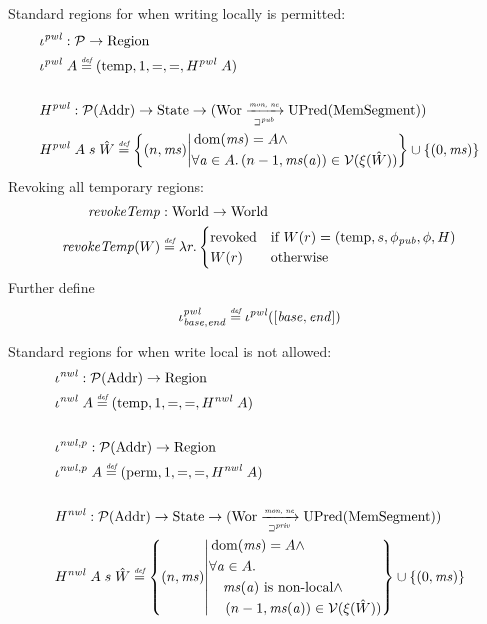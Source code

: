 \documentclass[a4paper]{article}
\newcommand{\fun}{\rightarrow}
\newcommand{\defeq}{\stackrel{\textit{\tiny{def}}}{=}}
\newcommand{\union}{\mathbin{\cup}}
\DeclareMathOperator{\dom}{dom}
\newcommand{\var}[1]{\mathit{#1}}
\newcommand{\hs}{\var{ms}}
\newcommand{\ms}{\hs}
\newcommand{\addr}{\var{a}}
\newcommand{\start}{\var{base}}
\newcommand{\addrend}{\var{end}}
\newcommand{\nwl}{\var{nwl}}
\newcommand{\pwl}{\var{pwl}}
\newcommand{\plainfun}[2]{
  \ifthenelse{\equal{#2}{}}
  {\mathit{#1}}
  {\mathit{#1}(#2)}
}
\newcommand{\revokeTemp}[1]{\plainfun{revokeTemp}{#1}}
\newcommand{\pub}{\var{pub}}
\newcommand{\futurewk}{\mathbin{\sqsupseteq}^{\var{pub}}}
\newcommand{\futurestr}{\mathbin{\sqsupseteq}^{\var{priv}}}
\newcommand{\monwknefun}{\xrightarrow[\text{\tiny{$\futurewk$}}]{\textit{\tiny{mon, ne}}}}
\newcommand{\monstrnefun}{\xrightarrow[\text{\tiny{$\futurestr$}}]{\textit{\tiny{mon, ne}}}}
\newcommand{\asmType}{\plaindom{AsmType}}
\newcommand{\plaindom}[1]{\mathrm{#1}}
\newcommand{\Addrs}{\plaindom{Addr}}
\newcommand{\HeapSegments}{\plaindom{MemSegment}}
\newcommand{\States}{\plaindom{State}}
\newcommand{\Regions}{\plaindom{Region}}
\newcommand{\Worlds}{\plaindom{World}}
\newcommand{\Wor}{\plaindom{Wor}}
\newcommand{\UPred}[1]{\plaindom{UPred}(#1)}
\newcommand{\intr}[2]{\mathcal{#1}}
\newcommand{\valueintr}[1]{\intr{V}{#1}}
\newcommand{\stdvr}{\valueintr{\asmType}}
\newcommand{\npair}[2][n]{\left(#1,#2 \right)}
\newcommand{\plainview}[1]{\mathrm{#1}}
\newcommand{\perma}{\plainview{perm}}
\newcommand{\temp}{\plainview{temp}}
\newcommand{\revoked}{\plainview{revoked}}
\newcommand{\nonlocal}[1]{\ensuremath{#1} \text{ is non-local}}
\begin{document}
Standard regions for when writing locally is permitted:
\begin{align*}
  &\iota^\pwl : \cal{P} \fun \Regions\\
  &\iota^\pwl\;A \defeq (\temp,1,=,=,H^\pwl \; A) \\
  \\
  &H^\pwl : \cal{P}(\Addrs) \fun \States \fun (\Wor \monwknefun \UPred{\HeapSegments})\\
  &H^\pwl\; A \; s \; \hat{W} \defeq \left\{\npair{\hs} \middle|
    \begin{aligned}
      &\dom(\hs) = A \land \\
      &\forall \addr \in A \ldotp \npair[n-1]{\hs(\addr)} \in \stdvr(\xi(\hat{W}))
    \end{aligned}
        \right\} \union \{\npair[0]{\ms} \}
\end{align*}
Revoking all temporary regions:
\begin{align*}
  \revokeTemp{} & : \Worlds \fun \Worlds \\
  \revokeTemp{W} & \defeq \lambda r \ldotp 
                   \begin{cases}
                     \revoked            & \text{if }W(r) = (\temp,s,\phi_\pub,\phi,H) \\
                     W(r)                & \text{otherwise}
                   \end{cases}
\end{align*}
Further define
\[
  \iota^\pwl_{\start,\addrend} \defeq \iota^\pwl([\start,\addrend])
\]


\newcommand{\wrev}[1]{\revokeTemp{#1}}


Standard regions for when write local is not allowed:
\begin{align*}
  &\iota^\nwl : \cal{P}(\Addrs) \fun \Regions \\
  &\iota^\nwl\; A \defeq (\temp,1,=,=,H^\nwl\;A) \\
  \\
  &\iota^{\nwl,p} : \cal{P}(\Addrs) \fun \Regions \\
  &\iota^{\nwl,p}\;A \defeq (\perma,1,=,=,H^\nwl\;A)\\
  \\
  &H^\nwl : \cal{P}(\Addrs) \fun \States \fun (\Wor \monstrnefun \UPred{\HeapSegments})\\
  &H^\nwl\;A \; s \;\hat{W} \defeq \left\{\npair{\hs} \middle|
    \begin{aligned}
      &\dom(\hs) = A \land \\
      &\forall \addr \in A \ldotp \\
      &\quad \nonlocal{\ms(\addr)} \land\\ 
      &\quad \npair[n-1]{\hs(\addr)} \in \stdvr(\xi(\hat{W}))
    \end{aligned}
        \right\} \union \{\npair[0]{\ms} \}
\end{align*}
\end{document}
